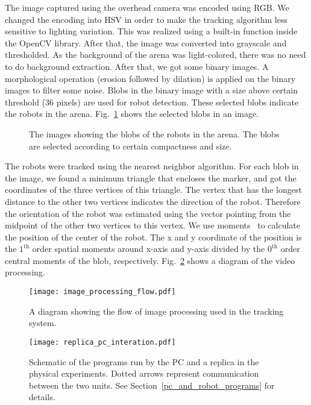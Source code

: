 The image captured using the overhead camera was encoded using RGB. We changed the encoding into HSV in order to make the tracking algorithm less sensitive to lighting variation. This was realized using a built-in function inside the OpenCV library. After that, the image was converted into grayscale and thresholded. As the background of the arena was light-colored, there was no need to do background extraction. After that, we got some binary images. A morphological operation (erosion followed by dilation) is applied on the binary images to filter some noise. Blobs in the binary image with a size above certain threshold (36 pixels) are used for robot detection. These selected blobs indicate the robots in the arena. Fig.~\ref{fig:binary_image_individuals} shows the selected blobs in an image. 
%
\begin{figure}[!t]%
	\centering
		\caption{The images showing the blobs of the robots in the arena. The blobs are selected according to certain compactness and size.}
		\label{fig:binary_image_individuals}
\end{figure}
%

The robots were tracked using the nearest neighbor algorithm. For each blob in the image, we found a minimum triangle that encloses the marker, and got the coordinates of the three vertices of this triangle. The vertex that has the longest distance to the other two vertices indicates the direction of the robot. Therefore the orientation of the robot was estimated using the vector pointing from the midpoint of the other two vertices to this vertex. We use moments~\citep{Hu1962} to calculate the position of the center of the robot. The x and y coordinate of the position is the $1^\mathrm{th}$ order spatial moments around x-axis and y-axis divided by the $0^\mathrm{th}$ order central moments of the blob, respectively. Fig.~\ref{fig:image_processing_flow} shows a diagram of the video processing. 
%
\begin{figure}[!t]
    \centering
    \texttt{[image: image\_processing\_flow.pdf]}
    \caption{A diagram showing the flow of image processing used in the tracking system.}
    \label{fig:image_processing_flow}
\end{figure} 
%
%
\begin{figure}[!t]
    \centering
    \texttt{[image: replica\_pc\_interation.pdf]}
    \caption{Schematic of the programs run by the PC and a replica in the physical experiments. Dotted arrows represent communication between the two units. See Section~\ref{pc_and_robot_programs} for details.}
    \label{fig:agent_pc_interation}
\end{figure} 
%
